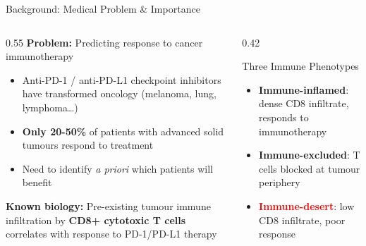 \documentclass[aspectratio=1610]{beamer}
\begin{document}
\begin{frame}{Background: Medical Problem \& Importance}
    \begin{columns}[T]
        \begin{column}{0.55\textwidth}
            \textbf{Problem:} Predicting response to cancer immunotherapy
            \begin{itemize}
                \item Anti-PD-1 / anti-PD-L1 checkpoint inhibitors have transformed oncology (melanoma, lung, lymphoma\ldots)
                \item \textbf{Only 20-50\%} of patients with advanced solid tumours respond to treatment
                \item Need to identify \textit{a priori} which patients will benefit
            \end{itemize}
            \vspace{0.3em}
            \textbf{Known biology:} Pre-existing tumour immune infiltration by \textbf{CD8+ cytotoxic T cells} correlates with response to PD-1/PD-L1 therapy
        \end{column}
        \begin{column}{0.42\textwidth}
            \begin{exampleblock}{Three Immune Phenotypes}
                \begin{itemize}
                    \item \textcolor{green!60!black}{\textbf{Immune-inflamed}}: dense CD8 infiltrate, responds to immunotherapy
                    \item \textbf{Immune-excluded}: T cells blocked at tumour periphery
                    \item \textcolor{red}{\textbf{Immune-desert}}: low CD8 infiltrate, poor response
                \end{itemize}
            \end{exampleblock}
        \end{column}
    \end{columns}
\end{frame}
\end{document}
